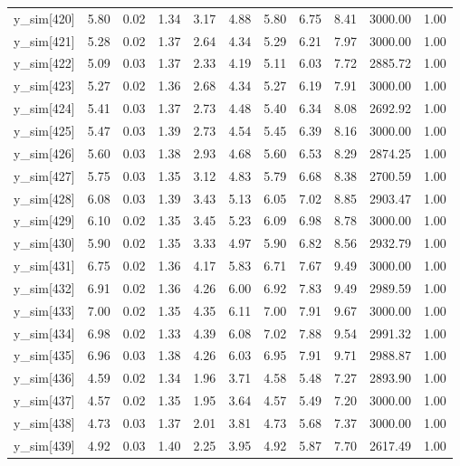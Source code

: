 \begin{table}[ht]
\begin{tabular}{rrrrrrrrrrr}
  y\_sim[420] & 5.80 & 0.02 & 1.34 & 3.17 & 4.88 & 5.80 & 6.75 & 8.41 & 3000.00 & 1.00 \\ 
  y\_sim[421] & 5.28 & 0.02 & 1.37 & 2.64 & 4.34 & 5.29 & 6.21 & 7.97 & 3000.00 & 1.00 \\ 
  y\_sim[422] & 5.09 & 0.03 & 1.37 & 2.33 & 4.19 & 5.11 & 6.03 & 7.72 & 2885.72 & 1.00 \\ 
  y\_sim[423] & 5.27 & 0.02 & 1.36 & 2.68 & 4.34 & 5.27 & 6.19 & 7.91 & 3000.00 & 1.00 \\ 
  y\_sim[424] & 5.41 & 0.03 & 1.37 & 2.73 & 4.48 & 5.40 & 6.34 & 8.08 & 2692.92 & 1.00 \\ 
  y\_sim[425] & 5.47 & 0.03 & 1.39 & 2.73 & 4.54 & 5.45 & 6.39 & 8.16 & 3000.00 & 1.00 \\ 
  y\_sim[426] & 5.60 & 0.03 & 1.38 & 2.93 & 4.68 & 5.60 & 6.53 & 8.29 & 2874.25 & 1.00 \\ 
  y\_sim[427] & 5.75 & 0.03 & 1.35 & 3.12 & 4.83 & 5.79 & 6.68 & 8.38 & 2700.59 & 1.00 \\ 
  y\_sim[428] & 6.08 & 0.03 & 1.39 & 3.43 & 5.13 & 6.05 & 7.02 & 8.85 & 2903.47 & 1.00 \\ 
  y\_sim[429] & 6.10 & 0.02 & 1.35 & 3.45 & 5.23 & 6.09 & 6.98 & 8.78 & 3000.00 & 1.00 \\ 
  y\_sim[430] & 5.90 & 0.02 & 1.35 & 3.33 & 4.97 & 5.90 & 6.82 & 8.56 & 2932.79 & 1.00 \\ 
  y\_sim[431] & 6.75 & 0.02 & 1.36 & 4.17 & 5.83 & 6.71 & 7.67 & 9.49 & 3000.00 & 1.00 \\ 
  y\_sim[432] & 6.91 & 0.02 & 1.36 & 4.26 & 6.00 & 6.92 & 7.83 & 9.49 & 2989.59 & 1.00 \\ 
  y\_sim[433] & 7.00 & 0.02 & 1.35 & 4.35 & 6.11 & 7.00 & 7.91 & 9.67 & 3000.00 & 1.00 \\ 
  y\_sim[434] & 6.98 & 0.02 & 1.33 & 4.39 & 6.08 & 7.02 & 7.88 & 9.54 & 2991.32 & 1.00 \\ 
  y\_sim[435] & 6.96 & 0.03 & 1.38 & 4.26 & 6.03 & 6.95 & 7.91 & 9.71 & 2988.87 & 1.00 \\ 
  y\_sim[436] & 4.59 & 0.02 & 1.34 & 1.96 & 3.71 & 4.58 & 5.48 & 7.27 & 2893.90 & 1.00 \\ 
  y\_sim[437] & 4.57 & 0.02 & 1.35 & 1.95 & 3.64 & 4.57 & 5.49 & 7.20 & 3000.00 & 1.00 \\ 
  y\_sim[438] & 4.73 & 0.03 & 1.37 & 2.01 & 3.81 & 4.73 & 5.68 & 7.37 & 3000.00 & 1.00 \\ 
  y\_sim[439] & 4.92 & 0.03 & 1.40 & 2.25 & 3.95 & 4.92 & 5.87 & 7.70 & 2617.49 & 1.00 \\ 

\end{tabular}
\end{table}
